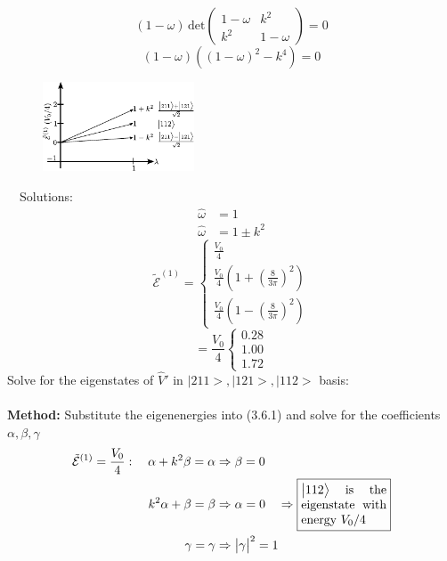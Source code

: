 \documentclass[12pt,fancychapters]{report}
\numberwithin{equation}{section}
\begin{document}
\[
  (1-\omega)\,\text{det}
  \begin{pmatrix}
    1-\omega & k^2\\
    k^2 & 1-\omega
  \end{pmatrix}
  = 0
\]
\[
  (1-\omega)\left((1-\omega)^2 - k^4\right) = 0
\]
\begin{figure}
  \begin{center}
\includegraphics[width=0.4\textwidth]{../Figures/EN3.pdf}
  \end{center}
\end{figure}
\
\
Solutions:
\begin{align*}
  \hat{\omega} &= 1\\
  \hat{\omega} & = 1 \pm k^2
\end{align*}
\begin{equation}
  \tilde{\mathcal{E}}^{(1)} = 
  \begin{cases}
  \frac{V_0}{4}\\
  \frac{V_0}{4}\left(1+\left(\frac{8}{3\pi}\right)^2\right)\\
\frac{V_0}{4}\left(1-\left(\frac{8}{3\pi}\right)^2\right)
\end{cases}
\end{equation}
\[
 = \frac{V_0}{4}
 \begin{cases}
  0.28\\
  1.00\\
  1.72
  \end{cases}
\]
Solve for the eigenstates of $\hat{V}'$ in {$ \big|211\big>, \big|121\big>, \big|112\big>$} basis:\\
\\
\textbf{Method:} Substitute the eigenenergies into (3.6.1)  and solve for the coefficients 
$\alpha, \beta, \gamma $
\begin{align*}
  \tilde{\mathcal{E}}^{(1)} = \frac{V_0}{4}:  \quad \alpha + k^2 \beta = \alpha &\Rightarrow \beta=0\\
  \quad k^2\alpha+\beta = \beta &\Rightarrow \alpha = 0\quad \Rightarrow \fbox{%
  \parbox{.2\textwidth}{%
  $\big|112\big>$ is the eigenstate with energy $V_0/4$}%
}\\
  \gamma = \gamma & \Rightarrow \big|\gamma\big|^2 = 1
\end{align*}
\end{document}
